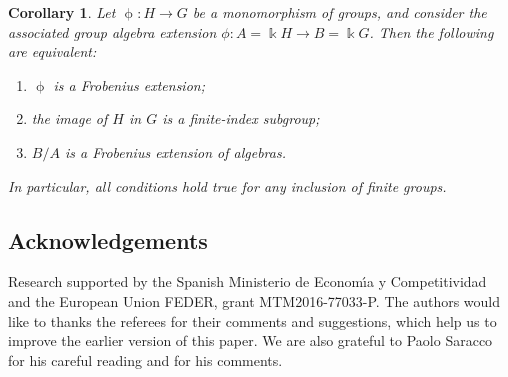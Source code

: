 \documentclass[pdftex]{sigma}
\numberwithin{equation}{section}
\newtheorem{Corollary}[Theorem]{Corollary}
\begin{document}
\begin{Corollary}\label{cor:FiniteI}Let $\upphi\colon H \to G$ be a monomorphism of groups, and consider the associated group algebra extension $\phi\colon A=\Bbbk H \to B=\Bbbk G$. Then the following are equivalent:
\begin{enumerate}[$1)$]\itemsep=0pt
\item $\upphi$ is a Frobenius extension;
\item the image of $H$ in $G$ is a finite-index subgroup;
\item $B/A$ is a Frobenius extension of algebras.
\end{enumerate}
In particular, all conditions hold true for any inclusion of finite groups.
\end{Corollary}

\subsection*{Acknowledgements}
Research supported by the Spanish Ministerio de Econom\'{\i}a y Competitividad and the European Union FEDER, grant MTM2016-77033-P.
The authors would like to thanks the referees for their comments and suggestions, which help us to improve the earlier version of this paper. We are also grateful to Paolo Saracco for his careful reading and for his comments.
\end{document}
